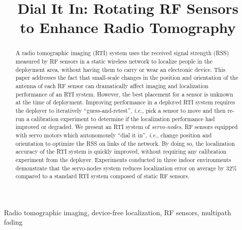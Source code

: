 \documentclass[conference]{IEEEtran}
\begin{document}
\title{Dial It In: Rotating RF Sensors \\to Enhance Radio Tomography}

\author{
}

\maketitle

\begin{abstract}
A radio tomographic imaging (RTI) system uses the received signal strength (RSS) measured by RF sensors in a static wireless network to localize people in the deployment area, without having them to carry or wear an electronic device.  This paper addresses the fact that small-scale changes in the position and orientation of the antenna of each RF sensor can dramatically affect imaging and localization performance of an RTI system. 
However, the best placement for a sensor is unknown at the time of deployment.  Improving performance in a deployed RTI system requires the deployer to iteratively ``guess-and-retest'', \emph{i.e.}, pick a sensor to move and then re-run a calibration experiment to determine if the localization performance had improved or degraded. We present an RTI system of \emph{servo-nodes}, RF sensors equipped with servo motors which autonomously ``dial it in'', \emph{i.e.}, change position and orientation to optimize the RSS on links of the network. By doing so, the localization accuracy of the RTI system is quickly improved, without requiring any calibration experiment from the deployer. Experiments conducted in three indoor environments demonstrate that the servo-nodes system reduces localization error on average by 32\% compared to a standard RTI system composed of static RF sensors.
\end{abstract}



\begin{keywords}
Radio tomographic imaging, device-free localization, RF sensors, multipath fading
\end{keywords}
\end{document}
